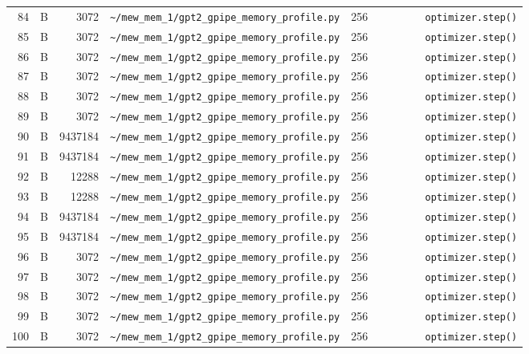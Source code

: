\documentclass{article}
\begin{document}
\begin{longtable}{r l r p{6.5cm} r p{7.0cm}}
84 & B & 3072 & \lstinline|~/mew_mem_1/gpt2_gpipe_memory_profile.py| & 256 & \lstinline|        optimizer.step()| \\
85 & B & 3072 & \lstinline|~/mew_mem_1/gpt2_gpipe_memory_profile.py| & 256 & \lstinline|        optimizer.step()| \\
86 & B & 3072 & \lstinline|~/mew_mem_1/gpt2_gpipe_memory_profile.py| & 256 & \lstinline|        optimizer.step()| \\
87 & B & 3072 & \lstinline|~/mew_mem_1/gpt2_gpipe_memory_profile.py| & 256 & \lstinline|        optimizer.step()| \\
88 & B & 3072 & \lstinline|~/mew_mem_1/gpt2_gpipe_memory_profile.py| & 256 & \lstinline|        optimizer.step()| \\
89 & B & 3072 & \lstinline|~/mew_mem_1/gpt2_gpipe_memory_profile.py| & 256 & \lstinline|        optimizer.step()| \\
90 & B & 9437184 & \lstinline|~/mew_mem_1/gpt2_gpipe_memory_profile.py| & 256 & \lstinline|        optimizer.step()| \\
91 & B & 9437184 & \lstinline|~/mew_mem_1/gpt2_gpipe_memory_profile.py| & 256 & \lstinline|        optimizer.step()| \\
92 & B & 12288 & \lstinline|~/mew_mem_1/gpt2_gpipe_memory_profile.py| & 256 & \lstinline|        optimizer.step()| \\
93 & B & 12288 & \lstinline|~/mew_mem_1/gpt2_gpipe_memory_profile.py| & 256 & \lstinline|        optimizer.step()| \\
94 & B & 9437184 & \lstinline|~/mew_mem_1/gpt2_gpipe_memory_profile.py| & 256 & \lstinline|        optimizer.step()| \\
95 & B & 9437184 & \lstinline|~/mew_mem_1/gpt2_gpipe_memory_profile.py| & 256 & \lstinline|        optimizer.step()| \\
96 & B & 3072 & \lstinline|~/mew_mem_1/gpt2_gpipe_memory_profile.py| & 256 & \lstinline|        optimizer.step()| \\
97 & B & 3072 & \lstinline|~/mew_mem_1/gpt2_gpipe_memory_profile.py| & 256 & \lstinline|        optimizer.step()| \\
98 & B & 3072 & \lstinline|~/mew_mem_1/gpt2_gpipe_memory_profile.py| & 256 & \lstinline|        optimizer.step()| \\
99 & B & 3072 & \lstinline|~/mew_mem_1/gpt2_gpipe_memory_profile.py| & 256 & \lstinline|        optimizer.step()| \\
100 & B & 3072 & \lstinline|~/mew_mem_1/gpt2_gpipe_memory_profile.py| & 256 & \lstinline|        optimizer.step()| \\

\end{longtable}
\end{document}

